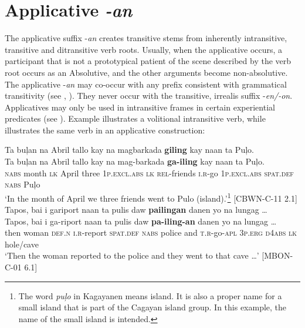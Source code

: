\section{Applicative \textit{-an}}
\label{bkm:Ref394919927} \label{sec:applicative-an}

The applicative suffix -\textit{an} creates transitive stems from inherently intransitive, transitive and ditransitive verb roots. Usually, when the applicative occurs, a participant that is not a prototypical patient of the scene described by the verb root occurs as an Absolutive, and the other arguments become non-absolutive. The applicative -\textit{an} may co-occur with any prefix consistent with grammatical transitivity (see , ). They never occur with the transitive, irrealis suffix -\textit{en/-on}. Applicatives may only be used in intransitive frames in certain experiential predicates (see ). Example  illustrates a volitional intransitive verb, while  illustrates the same verb in an applicative construction:

\ea
\label{bkm:Ref395170873}
Ta  buļan  na  Abril  tallo  kay  na  magbarkada \textbf{giling} kay  naan  ta  Puļo. \\\smallskip
\gll Ta  buļan  na  Abril  tallo  kay  na  mag-barkada \textbf{ga-iling} kay  naan  ta  Puļo. \\
\textsc{nabs} month  \textsc{lk}  April  three  1\textsc{p.excl.abs}  \textsc{lk}  \textsc{rel}-friends \textsc{i.r}-go
  1\textsc{p.excl.abs}  \textsc{spat.def}  \textsc{nabs}  Puļo \\
\glt `In the month of April we three friends went to Pulo (island).’\footnote{The word \textit{puļo} in Kagayanen means island. It is also a proper name for a small island that is part of the Cagayan island group. In this example, the name of the small island is intended.}  [CBWN-C-11 2.1]
\z
\ea
\label{bkm:Ref123019919}
Tapos,  bai  i  gariport  naan  ta  pulis  daw \textbf{pailingan}  danen  yo  na  lungag … \\\smallskip
\gll Tapos,  bai  i  ga-riport  naan  ta  pulis  daw \textbf{pa-iling-an}  danen  yo  na  lungag … \\
then  woman  \textsc{def.n}  \textsc{i.r}-report \textsc{spat.def}  \textsc{nabs}  police  and \textsc{t.r}-go-\textsc{apl}  3\textsc{p.erg}  \textsc{d}4\textsc{abs}  \textsc{lk}  hole/cave \\
\glt `Then the woman reported to the police and they went to that cave …’ [MBON-C-01 6.1]
\z

